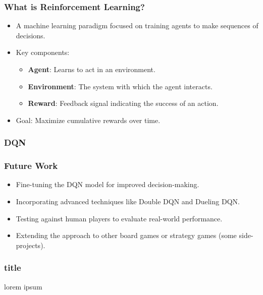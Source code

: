 \begin{frame}
	\frametitle{What is Reinforcement Learning?}
	\vspace{0.5cm}
	\begin{itemize}
		\item A machine learning paradigm focused on training agents to make sequences of decisions.
		\item Key components:
		\begin{itemize}
			\item \textbf{Agent}: Learns to act in an environment.
			\item \textbf{Environment}: The system with which the agent interacts.
			\item  \textbf{Reward}: Feedback signal indicating the success of an action.
		\end{itemize}
		\item Goal: Maximize cumulative rewards over time.
	\end{itemize}
\end{frame}



\begin{frame}
	\frametitle{DQN}
	\vspace{0.5cm}
\end{frame}





\begin{frame}
	\frametitle{Future Work}
	\vspace{0.5cm}
	\begin{itemize}
		\item Fine-tuning the DQN model for improved decision-making.
		\item Incorporating advanced techniques like Double DQN and Dueling DQN.
		\item Testing against human players to evaluate real-world performance.
		\item Extending the approach to other board games or strategy games (some side-projects).
	\end{itemize}
\end{frame}

\PraesentationMasterWeissBlau
\begin{frame}
\end{frame}
\PraesentationMasterStandard

\begin{frame}
    \frametitle{title}
    \vspace{0.5cm}
    lorem ipsum
\end{frame}







